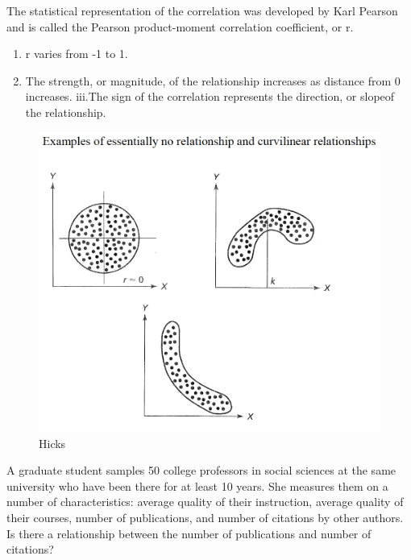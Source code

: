 \documentclass[]{book}
\providecommand{\tightlist}{%
  \setlength{\itemsep}{0pt}\setlength{\parskip}{0pt}}
\theoremstyle{definition}
\theoremstyle{definition}
\theoremstyle{definition}
\theoremstyle{remark}
\begin{document}
{The statistical representation of the correlation was developed by Karl
Pearson and is called the Pearson product-moment correlation
coefficient, or r.

\begin{enumerate}
\def\labelenumi{\roman{enumi}.}
\tightlist
\item
  r varies from -1 to 1.
\item
  The strength, or magnitude, of the relationship increases as distance
  from 0 increases. iii.The sign of the correlation represents the
  direction, or slopeof the relationship.
\end{enumerate}

\begin{figure}
\centering
\includegraphics{img/hickscor3.png}
\caption{Hicks}
\end{figure}

A graduate student samples 50 college professors in social sciences at
the same university who have been there for at least 10 years. She
measures them on a number of characteristics: average quality of their
instruction, average quality of their courses, number of publications,
and number of citations by other authors. Is there a relationship
between the number of publications and number of citations?

}
\end{document}
